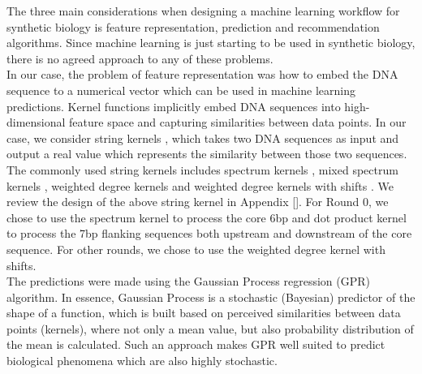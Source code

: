 \documentclass{article}
\begin{document}
The three main considerations when designing a machine learning workflow for synthetic biology is feature representation, prediction and recommendation algorithms.
Since machine learning is just starting to be used in synthetic biology, there is no agreed approach to any of these problems.\\
In our case, the problem of feature representation was how to embed the DNA sequence to a numerical vector which can be used in machine learning predictions. 
Kernel functions implicitly embed DNA sequences into high-dimensional feature space and capturing similarities between data points.  
In our case, we consider string kernels \cite{}, which takes two DNA sequences as input and output a real value which represents the similarity between those two sequences. 
The commonly used string kernels includes spectrum kernels \cite{}, mixed spectrum kernels \cite{}, weighted degree kernels \cite{} and weighted degree kernels with shifts \cite{}. 
We review the design of the above string kernel in Appendix \ref{}.
For Round 0, we chose to use the spectrum kernel to process the core 6bp and dot product kernel to process the 7bp flanking sequences both upstream and downstream of the core sequence.
For other rounds, we chose to use the weighted degree kernel with shifts. \\

The predictions were made using the Gaussian Process regression (GPR) algorithm. 
In essence, Gaussian Process is a stochastic (Bayesian) predictor of the shape of a function, which is built based on perceived similarities between data points (kernels), where not only a mean value, but also probability distribution of the mean is calculated. 
Such an approach makes GPR well suited to predict biological phenomena which are also highly stochastic. \\
\end{document}
